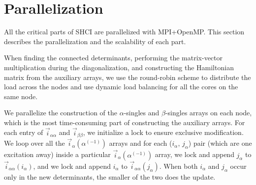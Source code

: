 \documentclass[%
reprint,
 superscriptaddress,
 amsmath,amssymb,
 aps,
]{revtex4-1}
\def\ia{i_\alpha}
\def\ja{j_\alpha}
\def\vecia{\vec{i}_\alpha}
\def\veciaa{\vec{i}_{\alpha\alpha}}
\def\vecibb{\vec{i}_{\beta\beta}}
\begin{document}
\section{Parallelization}
\label{para}

All the critical parts of SHCI are parallelized with MPI+OpenMP.
This section describes the parallelization and the scalability of each part.

When finding the connected determinants, performing the matrix-vector multiplication during the diagonalization,
and constructing the Hamiltonian matrix from the auxiliary arrays, we use the round-robin scheme to distribute the load across the nodes
and use dynamic load balancing for all the cores on the same node.


We parallelize the construction of the $\alpha$-singles and $\beta$-singles arrays on each node, which is the most time-consuming part of constructing the auxiliary arrays.
For each entry of $\veciaa$ and $\vecibb$, we initialize a lock to ensure exclusive modification.
We loop over all the $\vecia({\alpha^{(-1)}})$ arrays and for each ($\ia$, $\ja$) pair (which are one excitation away) inside a particular $\vecia({\alpha^{(-1)}})$ array,
we lock and append $\ja$ to $\veciaa{(\ia)}$, and
we lock and append $\ia$ to $\veciaa{(\ja)}$.
When both $\ia$ and $\ja$ occur only in the new determinants, the smaller of the two does the update.
\end{document}
